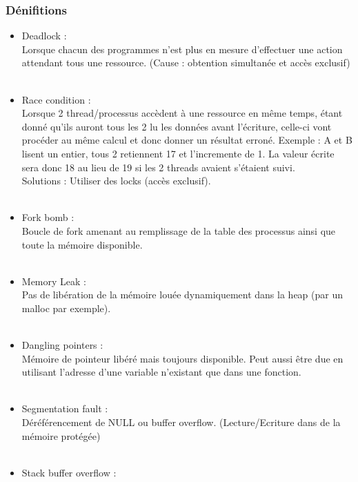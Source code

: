 \documentclass[a4paper]{article}
\begin{document}
\subsubsection{Dénifitions}
\begin{itemize}[label = \textbullet, font = \Large]
    \item Deadlock :\\
    Lorsque chacun des programmes n'est plus en mesure d'effectuer une action attendant tous une ressource. (Cause : obtention simultanée et accès exclusif)\\\\
    \item Race condition :\\
    Lorsque 2 thread/processus accèdent à une ressource en même temps, étant donné qu'ils auront tous les 2 lu les données avant l'écriture, celle-ci vont procéder au même calcul et donc donner un résultat erroné. Exemple : A et B lisent un entier, tous 2 retiennent 17 et l'incremente de 1. La valeur écrite sera donc 18 au lieu de 19 si les 2 threads avaient s'étaient suivi.\\ Solutions : Utiliser des locks (accès exclusif). \\\\
    \item Fork bomb :\\
    Boucle de fork amenant au remplissage de la table des processus ainsi que toute la mémoire disponible.\\\\
    \item Memory Leak :\\
    Pas de libération de la mémoire louée dynamiquement dans la heap (par un malloc par exemple).\\\\
    \item Dangling pointers :\\
    Mémoire de pointeur libéré mais toujours disponible. Peut aussi être due en utilisant l'adresse d'une variable n'existant que dans une fonction.\\\\
    \item Segmentation fault :\\
    Déréférencement de NULL ou buffer overflow. (Lecture/Ecriture dans de la mémoire protégée)\\\\
    \item Stack buffer overflow :\\

\end{itemize}
\end{document}
